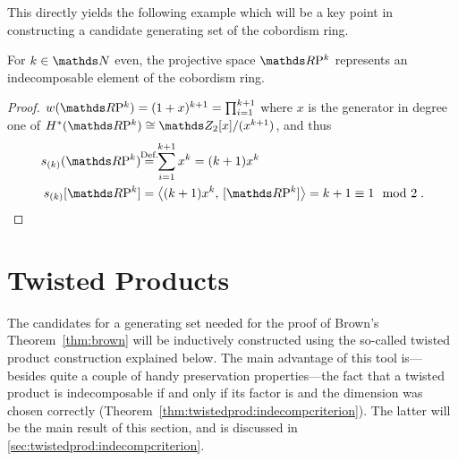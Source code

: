 This directly yields the following example which will be a key point
in constructing a candidate generating set of the cobordism ring.
\begin{Ex}\label{ex:rpnindecomposable}
  For $k\in\Nat$ even, the projective space $\RP k$ represents an
  indecomposable element of the cobordism ring.
  \begin{proof}
    $\W{\RP k} = (1+x)^{k+1}=\prod_{i=1}^{k+1}$ where $x$ is the
    generator in degree one of $\H^*(\RP k)\cong\Zmod2[x]/(x^{k+1})$,
    and thus
    \begin{align*}
      \s{(k)}(\RP k)
      &\cequalsby{Def.} \sum_{i=1}^{k+1} x^k
        = (k+1)x^k \\
      \snum{(k)}{\RP k}
      &= \capped{(k+1)x^k}{\fundcl{\RP k}}
        = k+1
        \equiv 1 \mod2
        \;.
        \qedhere
    \end{align*}
  \end{proof}
\end{Ex}

\section{Twisted Products}
\label{sec:twistedprod}
The candidates for a generating set needed for the proof of Brown's
Theorem~\ref{thm:brown} will be inductively constructed
using the so-called twisted product construction explained below.
The main advantage of this tool is---besides quite a couple of handy
preservation properties---the fact that a twisted product is
indecomposable if and only if its factor is and the dimension was
chosen correctly
(Theorem~\ref{thm:twistedprod:indecompcriterion}). The latter will
be the main result of this section, and is discussed in
\autoref{sec:twistedprod:indecompcriterion}.

